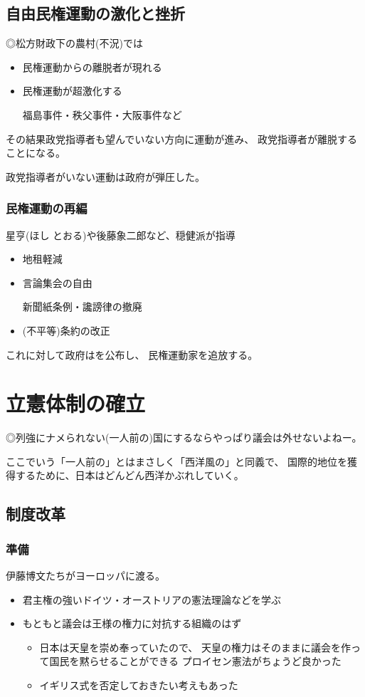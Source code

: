 \documentclass[12pt,fleqn]{ltjsarticle}
\begin{document}
\subsection{自由民権運動の激化と挫折}
◎松方財政下の農村(不況)では
\begin{itemize}
\item 民権運動からの離脱者が現れる
\item 民権運動が超激化する

福島事件・秩父事件・大阪事件など
\end{itemize}

その結果政党指導者も望んでいない方向に運動が進み、
政党指導者が離脱することになる。

政党指導者がいない運動は政府が弾圧した。

\subsubsection{民権運動の再編}
星亨(ほし とおる)や後藤象二郎など、穏健派が指導

\begin{itemize}
\item 地租軽減
\item 言論集会の自由

新聞紙条例・讒謗律の撤廃
\item (不平等)条約の改正
\end{itemize}

 これに対して政府はを公布し、
民権運動家を追放する。

\clearpage
\section{立憲体制の確立}
◎列強にナメられない(一人前の)国にするならやっぱり議会は外せないよねー。

ここでいう「一人前の」とはまさしく「西洋風の」と同義で、
国際的地位を獲得するために、日本はどんどん西洋かぶれしていく。

\subsection{制度改革}
\subsubsection{準備}
 伊藤博文たちがヨーロッパに渡る。
\begin{itemize}
\item 君主権の強いドイツ・オーストリアの憲法理論などを学ぶ
\item もともと議会は王様の権力に対抗する組織のはず

\begin{itemize}
\item 日本は天皇を崇め奉っていたので、
天皇の権力はそのままに議会を作って国民を黙らせることができる
プロイセン憲法がちょうど良かった
\item イギリス式を否定しておきたい考えもあった
\end{itemize}
\end{itemize}
\end{document}
